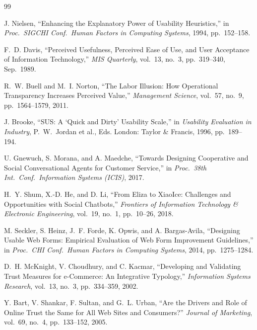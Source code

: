 \documentclass[journal, 10pt, twoside]{IEEEtran}
\begin{document}
\begin{thebibliography}{99}

  J. Nielsen,
  ``Enhancing the Explanatory Power of Usability Heuristics,''
  in \textit{Proc.\ SIGCHI Conf.\ Human Factors in Computing Systems},
  1994, pp.~152--158.

  F.~D. Davis,
  ``Perceived Usefulness, Perceived Ease of Use, and User Acceptance
  of Information Technology,''
  \textit{MIS Quarterly}, vol.~13, no.~3, pp.~319--340, Sep.\ 1989.

  R.~W. Buell and M.~I. Norton,
  ``The Labor Illusion: How Operational Transparency Increases Perceived
  Value,''
  \textit{Management Science}, vol.~57, no.~9, pp.~1564--1579, 2011.

  J. Brooke,
  ``SUS: A `Quick and Dirty' Usability Scale,''
  in \textit{Usability Evaluation in Industry},
  P.~W.~Jordan et al., Eds. London: Taylor \& Francis, 1996,
  pp.~189--194.

  U. Gnewuch, S. Morana, and A. Maedche,
  ``Towards Designing Cooperative and Social Conversational Agents
  for Customer Service,''
  in \textit{Proc.\ 38th Int.\ Conf.\ Information Systems (ICIS)},
  2017.

  H.~Y. Shum, X.-D. He, and D. Li,
  ``From Eliza to XiaoIce: Challenges and Opportunities with Social
  Chatbots,''
  \textit{Frontiers of Information Technology \& Electronic Engineering},
  vol.~19, no.~1, pp.~10--26, 2018.

  M. Seckler, S. Heinz, J.~F. Forde, K. Opwis, and A. Bargas-Avila,
  ``Designing Usable Web Forms: Empirical Evaluation of Web Form
  Improvement Guidelines,''
  in \textit{Proc.\ CHI Conf.\ Human Factors in Computing Systems},
  2014, pp.~1275--1284.

  D.~H. McKnight, V. Choudhury, and C. Kacmar,
  ``Developing and Validating Trust Measures for e-Commerce:
  An Integrative Typology,''
  \textit{Information Systems Research}, vol.~13, no.~3,
  pp.~334--359, 2002.

  Y. Bart, V. Shankar, F. Sultan, and G.~L. Urban,
  ``Are the Drivers and Role of Online Trust the Same for All Web
  Sites and Consumers?''
  \textit{Journal of Marketing}, vol.~69, no.~4, pp.~133--152, 2005.


\end{thebibliography}
\end{document}
